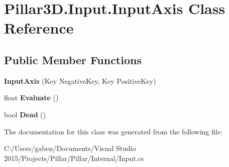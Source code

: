 \hypertarget{class_pillar3_d_1_1_input_1_1_input_axis}{}\section{Pillar3\+D.\+Input.\+Input\+Axis Class Reference}
\label{class_pillar3_d_1_1_input_1_1_input_axis}
\subsection*{Public Member Functions}
\begin{DoxyCompactItemize}
\item 
\mbox{\label{class_pillar3_d_1_1_input_1_1_input_axis_a04ef874c3f288fa704457e80a0e46e39}} 
{\bfseries Input\+Axis} (Key Negative\+Key, Key Positive\+Key)
\item 
\mbox{\label{class_pillar3_d_1_1_input_1_1_input_axis_a800eedc76bf45448b5439e018fd107fc}} 
float {\bfseries Evaluate} ()
\item 
\mbox{\label{class_pillar3_d_1_1_input_1_1_input_axis_adb374e448c292493a02915bbd82a0f7e}} 
bool {\bfseries Dead} ()
\end{DoxyCompactItemize}


The documentation for this class was generated from the following file\+:\begin{DoxyCompactItemize}
\item 
C\+:/\+Users/gaben/\+Documents/\+Visual Studio 2015/\+Projects/\+Pillar/\+Pillar/\+Internal/Input.\+cs\end{DoxyCompactItemize}
